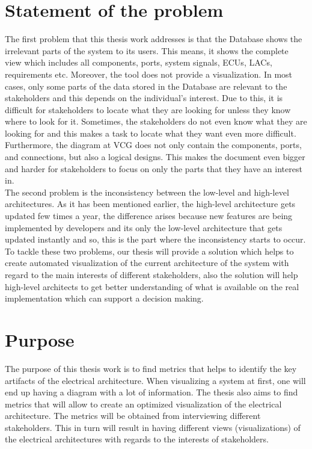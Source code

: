 \section{Statement of the problem} \label{Statement_ref}
The first problem that this thesis work addresses is that the Database shows the irrelevant parts of the system to its users. This means, it shows the complete view which includes all components, ports, system signals, ECUs, LACs, requirements etc. Moreover, the tool does not provide a visualization. In most cases, only some parts of the data stored in the Database are relevant to the stakeholders and this depends on the individual’s interest. Due to this, it is difficult for stakeholders to locate what they are looking for unless they know where to look for it. Sometimes, the stakeholders do not even know what they are looking for and this makes a task to locate what they want even more difficult. \\

Furthermore, the diagram at VCG does not only contain the components, ports, and connections, but also a logical designs. This makes the document even bigger and harder for stakeholders to focus on only the parts that they have an interest in. \\ 

The second problem is the inconsistency between the low-level and high-level architectures. As it has been mentioned earlier, the high-level architecture gets updated few times a year, the difference arises because new features are being implemented by developers and its only the low-level architecture that gets updated instantly and so, this is the part where the inconsistency starts to occur. \\ 

To tackle these two problems, our thesis will provide a solution which helps to create automated visualization of the current architecture of the system with regard to the main interests of different stakeholders, also the solution will help high-level architects to get better understanding of what is available on the real implementation which can support a decision making.


\section{Purpose} \label{Purpose_ref}
The purpose of this thesis work is to find metrics that helps to identify the key artifacts of the electrical architecture. When visualizing a system at first, one will end up having a diagram with a lot of information. The thesis also aims to find metrics that will allow to create an optimized visualization of the electrical architecture. The metrics will be obtained from interviewing different stakeholders. This in turn will result in having different views (visualizations) of the electrical architectures with regards to the interests of stakeholders. \\


